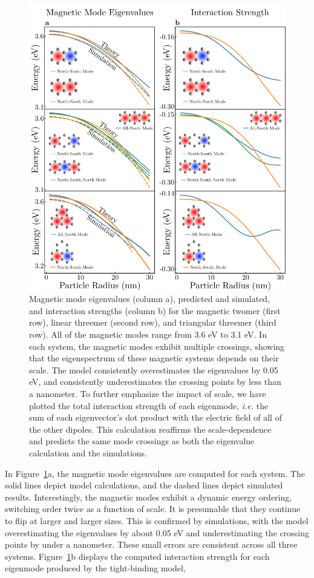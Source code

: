 \documentclass[journal=ancac3,manuscript=article]{achemso}
\begin{document}
\begin{figure}
\centering
\includegraphics[width=.6\paperwidth]{magnetic_mode_eigenvalues_and_interactions.png}
\caption{Magnetic mode eigenvalues (column a), predicted and simulated, and interaction strengths (column b) for the magnetic twomer (first row), linear threemer (second row), and triangular threemer (third row). All of the magnetic modes range from 3.6 eV to 3.1 eV. In each system, the magnetic modes exhibit multiple crossings, showing that the eigenspectrum of these magnetic systems depends on their scale. The model consistently overestimates the eigenvalues by 0.05 eV, and consistently underestimates the crossing points by less than a nanometer. To further emphasize the impact of scale, we have plotted the total interaction strength of each eigenmode, \textit{i.e.} the sum of each eigenvector's dot product with the electric field of all of the other dipoles. This calculation reaffirms the scale-dependence and predicts the same mode crossings as both the eigenvalue calculation and the simulations.}
\label{magmodes}
\end{figure}

In Figure~\ref{magmodes}a, the magnetic mode eigenvalues are computed for each system. The solid lines depict model calculations, and the dashed lines depict simulated results. Interestingly, the magnetic modes exhibit a dynamic energy ordering, switching order twice as a function of scale. It is presumable that they continue to flip at larger and larger sizes. This is confirmed by simulations, with the model overestimating the eigenvalues by about 0.05 eV and underestimating the crossing points by under a nanometer. These small errors are consistent across all three systems. Figure~\ref{magmodes}b displays the computed interaction strength for each eigenmode produced by the tight-binding model,
\end{document}
